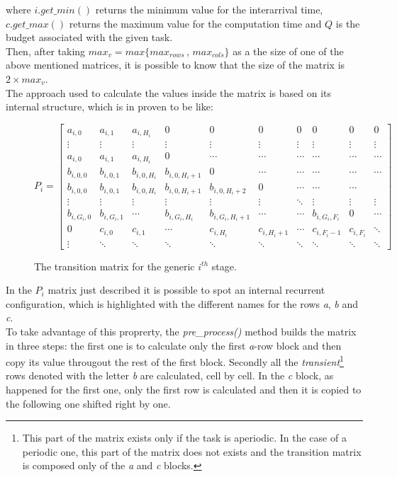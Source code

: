where \( i.get\_min() \) returns the minimum value for the interarrival time, \( c.get\_max() \) returns the maximum value for the computation time and \( Q \) is the budget associated with the given task.\\
Then, after taking \( max_{v} = max\{max_{rows}\,,\,max_{cols}\} \) as a the size of one of the above mentioned matrices, it is possible to know that the size of the matrix is \( 2 \times max_{v} \).\\
The approach used to calculate the values inside the matrix is based on its internal structure, which is in proven\cite{pipelines} to be like:
\begin{figure}[H]
\begin{equation*} \label{transitionmatrix2}
  P_{i} = 
  \begin{bmatrix}
    a_{i,0} & a_{i,1} & a_{i,H_{i}} & 0 & 0 & 0 & 0 & 0 & 0 & 0 \\
    \vdots & \vdots & \vdots & \vdots & \vdots & \vdots & \vdots & \vdots & \vdots & \vdots\\
    a_{i,0} & a_{i,1} & a_{i,H_{i}} & 0 & \cdots & \cdots & \cdots & \cdots & \cdots & \cdots \\
    b_{i,0,0} & b_{i,0,1} & b_{i,0,H_{i}} & b_{i,0,H_{i}+1} & 0 & \cdots & \cdots & \cdots & \cdots & \cdots \\
    b_{i,0,0} & b_{i,0,1} & b_{i,0,H_{i}} & b_{i,0,H_{i}+1} & b_{i,0,H_{i}+2} & 0 & \cdots & \cdots & \cdots \\
    \vdots & \vdots & \vdots & \vdots & \vdots & \vdots & \ddots & \vdots & \vdots & \vdots \\
    b_{i,G_{i},0} & b_{i,G_{i},1} & \cdots & b_{i,G_{i},H_{i}} & b_{i,G_{i},H_{i}+1} & \cdots & \cdots & b_{i,G_{i},F_{i}} & 0 & \cdots \\
    0 & c_{i,0} & c_{i,1} & \cdots & c_{i,H_{i}} & c_{i,H_{i}+1} & \cdots & c_{i,F_{i}-1} & c_{i,F_{i}} & \ddots \\
    \vdots & \ddots & \ddots & \ddots & \ddots & \ddots & \ddots & \ddots & \ddots & \ddots
  \end{bmatrix}
\end{equation*}
\caption{The transition matrix for the generic \( i^{th} \) stage.}
\end{figure}

In the \( P_{i} \) matrix just described it is possible to spot an internal recurrent configuration, which is highlighted with the different names for the rows \emph{a}, \emph{b} and \emph{c}.\\
To take advantage of this proprerty, the \emph{pre\_process()} method builds the matrix in three steps: the first one is to calculate only the first \emph{a}-row block and then copy its value througout the rest of the first block. Secondly all the \emph{transient}\footnote{This part of the matrix exists only if the task is aperiodic. In the case of a periodic one, this part of the matrix does not exists and the transition matrix is composed only of the \emph{a} and \emph{c} blocks.} rows denoted with the letter \emph{b} are calculated, cell by cell. In the \emph{c} block, as happened for the first one, only the first row is calculated and then it is copied to the following one shifted right by one.